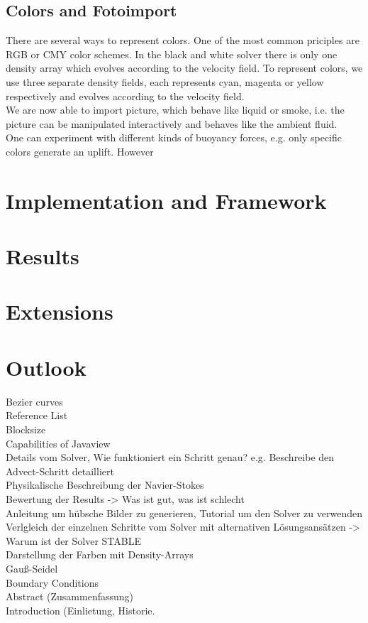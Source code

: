 \documentclass[a4paper,10pt,oneside,final,german,openbib,pdftex,titlepage]{scrbook}
\begin{document}
\section{Colors and Fotoimport}
There are several ways to represent colors. One of the most common priciples are RGB or CMY color schemes. In the black and white solver there is only one density array which evolves according to the velocity field. To represent colors, we use three separate density fields, each represents cyan, magenta or yellow respectively and evolves according to the velocity field.\\
We are now able to import picture, which behave like liquid or smoke, i.e. the picture can be manipulated interactively and behaves like the ambient fluid.\\
One can experiment with different kinds of buoyancy forces, e.g. only specific colors generate an uplift. However 

\chapter{Implementation and Framework}
\chapter{Results}
\chapter{Extensions}
\chapter{Outlook}

Bezier curves\\
Reference List\\
Blocksize\\
Capabilities of Javaview\\
Details vom Solver, Wie funktioniert ein Schritt genau? e.g. Beschreibe den Advect-Schritt detailliert\\
Physikalische Beschreibung der Navier-Stokes\\
Bewertung der Results -> Was ist gut, was ist schlecht\\
Anleitung um hübsche Bilder zu generieren, Tutorial um den Solver zu verwenden\\
Verlgleich der einzelnen Schritte vom Solver mit alternativen Lösungsansätzen -> Warum ist der Solver STABLE\\
Darstellung der Farben mit Density-Arrays\\
Gauß-Seidel\\
Boundary Conditions\\
Abstract (Zusammenfassung)\\
Introduction (Einlietung, Historie.\\
\end{document}
